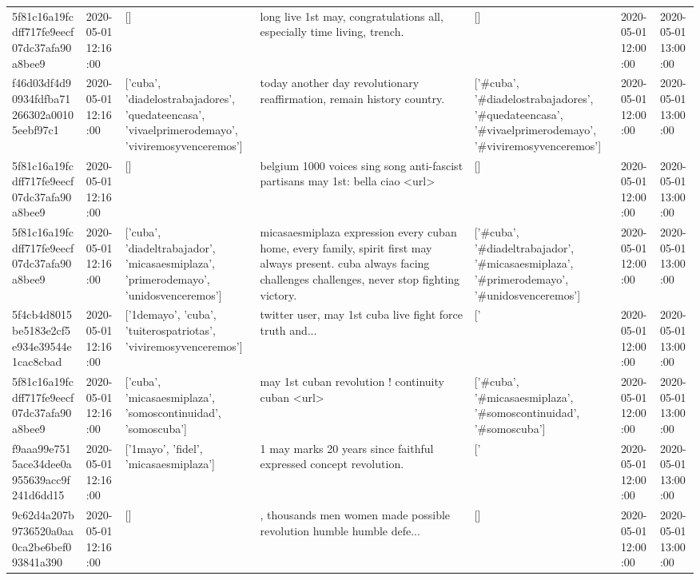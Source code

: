 \begin{tabular}{lllllll}
5f81c16a19fcdff717fe9eecf07dc37afa90a8bee9 & 2020-05-01 12:16:00 & [] & long live 1st may, congratulations all, especially time living, trench. & [] & 2020-05-01 12:00:00 & 2020-05-01 13:00:00 \\
f46d03df4d90934fdfba71266302a00105eebf97c1 & 2020-05-01 12:16:00 & ['cuba', 'diadelostrabajadores', 'quedateencasa', 'vivaelprimerodemayo', 'viviremosyvenceremos'] & today another day revolutionary reaffirmation, remain history country. & ['#cuba', '#diadelostrabajadores', '#quedateencasa', '#vivaelprimerodemayo', '#viviremosyvenceremos'] & 2020-05-01 12:00:00 & 2020-05-01 13:00:00 \\
5f81c16a19fcdff717fe9eecf07dc37afa90a8bee9 & 2020-05-01 12:16:00 & [] & belgium 1000 voices sing song anti-fascist partisans may 1st: bella ciao <url> & [] & 2020-05-01 12:00:00 & 2020-05-01 13:00:00 \\
5f81c16a19fcdff717fe9eecf07dc37afa90a8bee9 & 2020-05-01 12:16:00 & ['cuba', 'diadeltrabajador', 'micasaesmiplaza', 'primerodemayo', 'unidosvenceremos'] & micasaesmiplaza expression every cuban home, every family, spirit first may always present. cuba always facing challenges challenges, never stop fighting victory. & ['#cuba', '#diadeltrabajador', '#micasaesmiplaza', '#primerodemayo', '#unidosvenceremos'] & 2020-05-01 12:00:00 & 2020-05-01 13:00:00 \\
5f4cb4d8015be5183e2cf5e934e39544e1cac8cbad & 2020-05-01 12:16:00 & ['1demayo', 'cuba', 'tuiterospatriotas', 'viviremosyvenceremos'] & twitter user, may 1st cuba live fight force truth and... & ['#1demayo', '#cuba', '#tuiterospatriotas', '#viviremosyvenceremos'] & 2020-05-01 12:00:00 & 2020-05-01 13:00:00 \\
5f81c16a19fcdff717fe9eecf07dc37afa90a8bee9 & 2020-05-01 12:16:00 & ['cuba', 'micasaesmiplaza', 'somoscontinuidad', 'somoscuba'] & may 1st cuban revolution ! continuity cuban <url> & ['#cuba', '#micasaesmiplaza', '#somoscontinuidad', '#somoscuba'] & 2020-05-01 12:00:00 & 2020-05-01 13:00:00 \\
f9aaa99e7515ace34dee0a955639acc9f241d6dd15 & 2020-05-01 12:16:00 & ['1mayo', 'fidel', 'micasaesmiplaza'] & 1 may marks 20 years since faithful expressed concept revolution. & ['#1mayo', '#fidel', '#micasaesmiplaza'] & 2020-05-01 12:00:00 & 2020-05-01 13:00:00 \\
9c62d4a207b9736520a0aa0ca2be6bef093841a390 & 2020-05-01 12:16:00 & [] & , thousands men women made possible revolution humble humble defe... & [] & 2020-05-01 12:00:00 & 2020-05-01 13:00:00 \\

\end{tabular}
